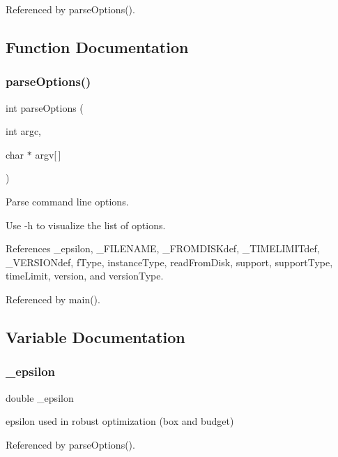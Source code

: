 Referenced by parse\+Options().



\subsection{Function Documentation}
\mbox{\label{options_8cpp_a8ddddf1e9743696419ce3747d49a54e6}} 
\subsubsection{parse\+Options()}
{\footnotesize\ttfamily int parse\+Options (\begin{DoxyParamCaption}\item[{int}]{argc,  }\item[{char $\ast$}]{argv[$\,$] }\end{DoxyParamCaption})}



Parse command line options. 

Use -\/h to visualize the list of options. 

References \+\_\+epsilon, \+\_\+\+F\+I\+L\+E\+N\+A\+ME, \+\_\+\+F\+R\+O\+M\+D\+I\+S\+Kdef, \+\_\+\+T\+I\+M\+E\+L\+I\+M\+I\+Tdef, \+\_\+\+V\+E\+R\+S\+I\+O\+Ndef, f\+Type, instance\+Type, read\+From\+Disk, support, support\+Type, time\+Limit, version, and version\+Type.



Referenced by main().



\subsection{Variable Documentation}
\mbox{\label{options_8cpp_a5f1bf5c9d677b8a8e18bd6ea5c4da0bb}} 
\subsubsection{\+\_\+epsilon}
{\footnotesize\ttfamily double \+\_\+epsilon}



epsilon used in robust optimization (box and budget) 



Referenced by parse\+Options().


